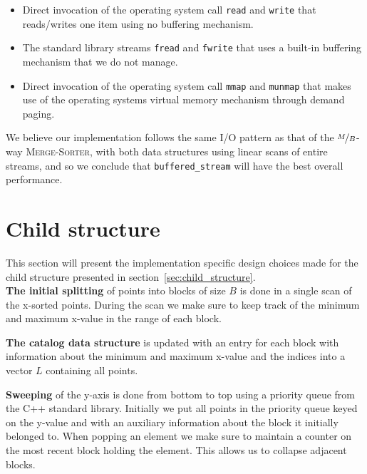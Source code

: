 \documentclass[twoside,11pt,openright]{report}
\begin{document}
\begin{itemize}
	\item Direct invocation of the operating system call \texttt{read} and \texttt{write} that reads/writes one item using no buffering mechanism.
	\item The standard library streams \texttt{fread} and \texttt{fwrite} that uses a built-in buffering mechanism that we do not manage.
	\item Direct invocation of the operating system call \texttt{mmap} and \texttt{munmap} that makes use of the operating systems virtual memory mechanism through demand paging.
\end{itemize}

We believe our implementation follows the same I/O pattern as that of the $\nicefrac{M}{B}$-way \textsc{Merge-Sorter}, with both data structures using linear scans of entire streams, and so we conclude that \texttt{buffered\_stream} will have the best overall performance.


\section{Child structure}
This section will present the implementation specific design choices made for the child structure presented in section~\ref{sec:child_structure}. \\

\textbf{The initial splitting} of points into blocks of size $B$ is done in a single scan of the x-sorted points. During the scan we make sure to keep track of the minimum and maximum x-value in the range of each block.

\textbf{The catalog data structure} is updated with an entry for each block with information about the minimum and maximum x-value and the indices into a vector $L$ containing all points.

\textbf{Sweeping} of the y-axis is done from bottom to top using a priority queue from the C++ standard library. Initially we put all points in the priority queue keyed on the y-value and with an auxiliary information about the block it initially belonged to. When popping an element we make sure to maintain a counter on the most recent block holding the element. This allows us to collapse adjacent blocks.
\end{document}
